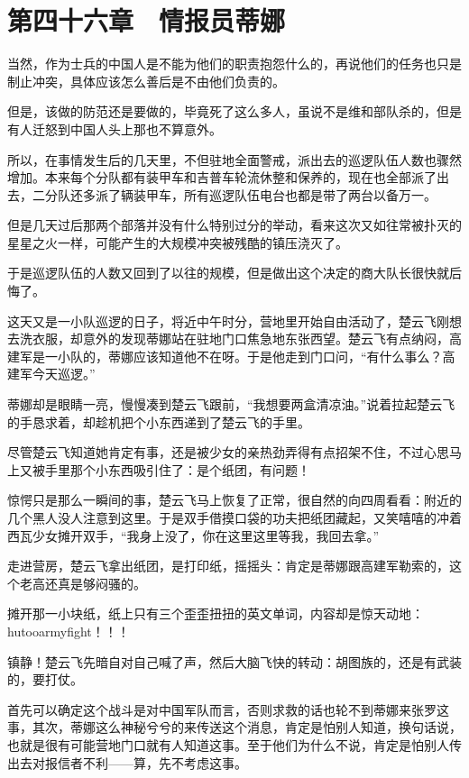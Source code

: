 \section{第四十六章　情报员蒂娜}

当然，作为士兵的中国人是不能为他们的职责抱怨什么的，再说他们的任务也只是制止冲突，具体应该怎么善后是不由他们负责的。

但是，该做的防范还是要做的，毕竟死了这么多人，虽说不是维和部队杀的，但是有人迁怒到中国人头上那也不算意外。

所以，在事情发生后的几天里，不但驻地全面警戒，派出去的巡逻队伍人数也骤然增加。本来每个分队都有装甲车和吉普车轮流休整和保养的，现在也全部派了出去，二分队还多派了辆装甲车，所有巡逻队伍电台也都是带了两台以备万一。

但是几天过后那两个部落并没有什么特别过分的举动，看来这次又如往常被扑灭的星星之火一样，可能产生的大规模冲突被残酷的镇压浇灭了。

于是巡逻队伍的人数又回到了以往的规模，但是做出这个决定的商大队长很快就后悔了。

这天又是一小队巡逻的日子，将近中午时分，营地里开始自由活动了，楚云飞刚想去洗衣服，却意外的发现蒂娜站在驻地门口焦急地东张西望。楚云飞有点纳闷，高建军是一小队的，蒂娜应该知道他不在呀。于是他走到门口问，“有什么事么？高建军今天巡逻。”

蒂娜却是眼睛一亮，慢慢凑到楚云飞跟前，“我想要两盒清凉油。”说着拉起楚云飞的手恳求着，却趁机把个小东西递到了楚云飞的手里。

尽管楚云飞知道她肯定有事，还是被少女的亲热劲弄得有点招架不住，不过心思马上又被手里那个小东西吸引住了：是个纸团，有问题！

惊愕只是那么一瞬间的事，楚云飞马上恢复了正常，很自然的向四周看看：附近的几个黑人没人注意到这里。于是双手借摸口袋的功夫把纸团藏起，又笑嘻嘻的冲着西瓦少女摊开双手，“我身上没了，你在这里这里等我，我回去拿。”

走进营房，楚云飞拿出纸团，是打印纸，摇摇头：肯定是蒂娜跟高建军勒索的，这个老高还真是够闷骚的。

摊开那一小块纸，纸上只有三个歪歪扭扭的英文单词，内容却是惊天动地：hutooarmyfight！！！

镇静！楚云飞先暗自对自己喊了声，然后大脑飞快的转动：胡图族的，还是有武装的，要打仗。

首先可以确定这个战斗是对中国军队而言，否则求救的话也轮不到蒂娜来张罗这事，其次，蒂娜这么神秘兮兮的来传送这个消息，肯定是怕别人知道，换句话说，也就是很有可能营地门口就有人知道这事。至于他们为什么不说，肯定是怕别人传出去对报信者不利——算，先不考虑这事。

